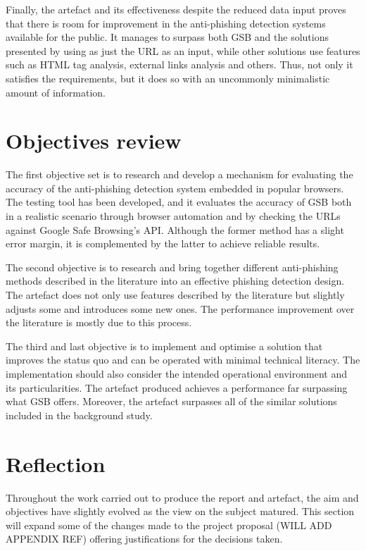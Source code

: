 Finally, the artefact and its effectiveness despite the reduced data input proves that there is room for improvement in the anti-phishing detection systems available for the public. It manages to surpass both GSB and the solutions presented by \cite{Adebowale} using as just the URL as an input, while other solutions use features such as HTML tag analysis, external links analysis and others. Thus, not only it satisfies the requirements, but it does so with an uncommonly minimalistic amount of information.

\section{Objectives review}
The first objective set is to research and develop a mechanism for evaluating the accuracy of the anti-phishing detection system embedded in popular browsers. The testing tool has been developed, and it evaluates the accuracy of GSB both in a realistic scenario through browser automation and by checking the URLs against Google Safe Browsing's API. Although the former method has a slight error margin, it is complemented by the latter to achieve reliable results.

The second objective is to research and bring together different anti-phishing methods described in the literature into an effective phishing detection design. The artefact does not only use features described by the literature but slightly adjusts some and introduces some new ones. The performance improvement over the literature is mostly due to this process.

The third and last objective is to implement and optimise a solution that improves the status quo and can be operated with minimal technical literacy. The implementation should also consider the intended operational environment and its particularities. The artefact produced achieves a performance far surpassing what GSB offers. Moreover, the artefact surpasses all of the similar solutions included in the background study.

\section{Reflection}
Throughout the work carried out to produce the report and artefact, the aim and objectives have slightly evolved as the view on the subject matured. This section will expand some of the changes made to the project proposal (WILL ADD APPENDIX REF) offering justifications for the decisions taken.

